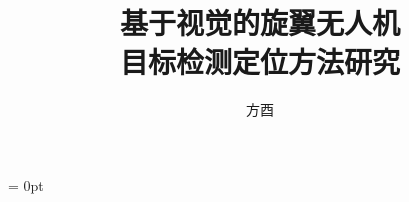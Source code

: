 \documentclass[twoside,UTF8]{nputhesis}
\title[Research on Vision-based Object Detection and Localization for Rotorcraft UAVs]{基于视觉的旋翼无人机\\目标检测定位方法研究}
\author[You Fang]{方酉}
\begin{document}
\makecover  %
\frontmatter


\tableofcontents 
\mainmatter  %

\parskip = 0pt %













\backmatter




\Thanks


\Work


\statement
\end{document}
